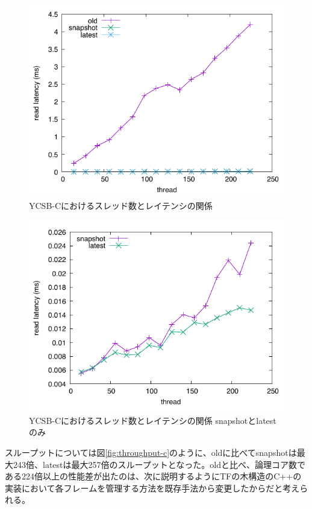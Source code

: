 \documentclass[a4paper]{jreport}	%
\begin{document}
\begin{figure}[h] 
\centering
\includegraphics[width=15cm]{ycsb-c/opposite-read-latency}
\caption{YCSB-Cにおけるスレッド数とレイテンシの関係}
\label{fig:latency-c}
\end{figure}

\begin{figure}[h] 
\centering
\includegraphics[width=15cm]{ycsb-c/opposite-read-latency2}
\caption{YCSB-Cにおけるスレッド数とレイテンシの関係 snapshotとlatestのみ}
\label{fig:latency-c2}
\end{figure}

スループットについては図\ref{fig:throughput-c}のように、oldに比べてsnapshotは最大243倍、latestは最大257倍のスループットとなった。oldと比べ、論理コア数である224倍以上の性能差が出たのは、次に説明するようにTFの木構造のC++の実装において各フレームを管理する方法を既存手法から変更したからだと考えられる。
\end{document}
